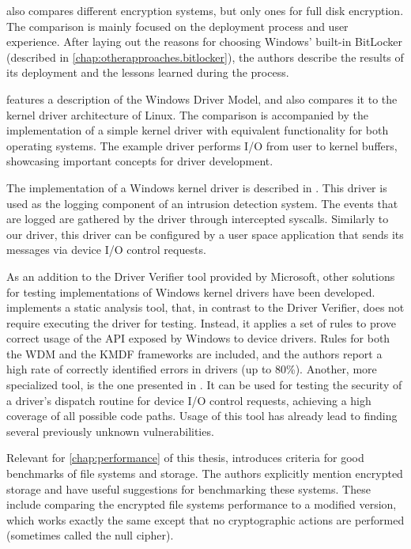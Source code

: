 \cite{Lewis2018} also compares different encryption systems, but only ones for full disk encryption. The comparison is mainly focused on the deployment process and user experience. After laying out the reasons for choosing Windows' built-in BitLocker (described in \autoref{chap:otherapproaches.bitlocker}), the authors describe the results of its deployment and the lessons learned during the process.

\cite{Tsegaye2004} features a description of the Windows Driver Model, and also compares it to the kernel driver architecture of Linux. The comparison is accompanied by the implementation of a simple kernel driver with equivalent functionality for both operating systems. The example driver performs I/O from user to kernel buffers, showcasing important concepts for driver development.

The implementation of a Windows kernel driver is described in \cite{Battistoni2008}. This driver is used as the logging component of an intrusion detection system. The events that are logged are gathered by the driver through intercepted syscalls. Similarly to our driver, this driver can be configured by a user space application that sends its messages via device I/O control requests.

As an addition to the Driver Verifier tool provided by Microsoft, other solutions for testing implementations of Windows kernel drivers have been developed. \cite{Ball2006} implements a static analysis tool, that, in contrast to the Driver Verifier, does not require executing the driver for testing. Instead, it applies a set of rules to prove correct usage of the API exposed by Windows to device drivers. Rules for both the WDM and the KMDF frameworks are included, and the authors report a high rate of correctly identified errors in drivers (up to 80\%). Another, more specialized tool, is the one presented in \cite{Ni2012}. It can be used for testing the security of a driver's dispatch routine for device I/O control requests, achieving a high coverage of all possible code paths. Usage of this tool has already lead to finding several previously unknown vulnerabilities.

Relevant for \autoref{chap:performance} of this thesis, \cite{Traeger2008} introduces criteria for good benchmarks of file systems and storage. The authors explicitly mention encrypted storage and have useful suggestions for benchmarking these systems. These include comparing the encrypted file systems performance to a modified version, which works exactly the same except that no cryptographic actions are performed (sometimes called the null cipher).

